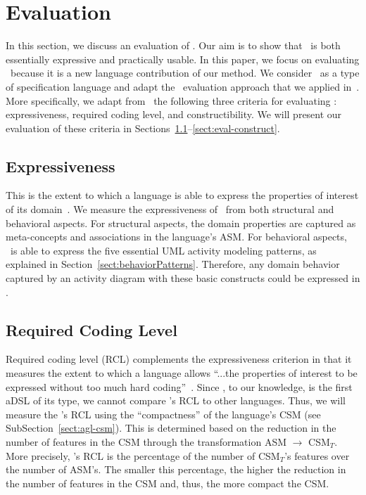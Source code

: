 %
\section{Evaluation}
\label{sect:evaluation} %

In this section, we discuss an evaluation of \agl. Our aim is to show that \agl~is both  essentially expressive and practically usable.
%
In this paper, we focus on evaluating \agl~because it is a new language contribution of our method. We consider \agl~as a type of specification language and adapt the \dcsl~evaluation approach that we applied in~\cite{le_domain_2018}.
%
More specifically, we adapt from~\cite{lamsweerde_formal_2000} the following three criteria for evaluating \agl: expressiveness, required coding level, and constructibility. We will present our evaluation of these criteria in Sections~\ref{sect:eval-expressiveness}--\ref{sect:eval-construct}.
%
\subsection{Expressiveness} \label{sect:eval-expressiveness}
This is the extent to which a language is able to express the properties of interest of its domain~\cite{lamsweerde_formal_2000}. We measure the expressiveness of \agl~from both structural and behavioral aspects. 
%
For structural aspects, the domain properties are captured as meta-concepts and associations in the language's ASM. 
%
For behavioral aspects, \agl~is able to express the five essential UML activity modeling patterns, as explained in Section~\ref{sect:behaviorPatterns}. Therefore, any domain behavior captured by an activity diagram with these basic constructs could be expressed in \agl.

\subsection{Required Coding Level} \label{sect:eval-rcl}
Required coding level (RCL) complements the expressiveness criterion in that it measures the extent to which a language allows ``...the properties of interest to be expressed without too much hard coding''~\cite{lamsweerde_formal_2000}.
Since \agl, to our knowledge, is the first aDSL of its type, we cannot compare \agl's RCL to other languages. Thus, we will measure the \agl's RCL using the ``compactness'' of the language's CSM (see SubSection~\ref{sect:agl-csm}). This is determined based on the reduction in the number of features in the CSM through the transformation ASM $\rightarrow$ CSM$_T$. More precisely, \agl's RCL is the percentage of the number of CSM$_T$'s features over the number of ASM's. The smaller this percentage, the higher the reduction in the number of features in the CSM and, thus, the more compact the CSM.

